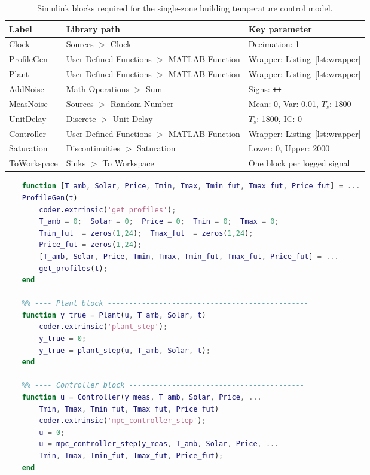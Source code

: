 \begin{table}[!htbp]
	\centering
	\caption{Simulink blocks required for the single-zone building
		temperature control model.}
	\label{tab:blocks}
	\begin{tabular}{>{\ttfamily\small}l >{\small}l >{\small}p{5.5cm}}
		\toprule
		\normalfont\textbf{Label} & \textbf{Library path} & \textbf{Key parameter} \\
		\midrule
		Clock       & Sources $>$ Clock                           & Decimation: 1 \\
		ProfileGen  & User-Defined Functions $>$ MATLAB Function  & Wrapper: Listing~\ref{lst:wrapper} \\
		Plant       & User-Defined Functions $>$ MATLAB Function  & Wrapper: Listing~\ref{lst:wrapper} \\
		AddNoise    & Math Operations $>$ Sum                     & Signs: \texttt{++} \\
		MeasNoise   & Sources $>$ Random Number                   & Mean: 0, Var: 0.01, $T_s$: 1800 \\
		UnitDelay   & Discrete $>$ Unit Delay                     & $T_s$: 1800, IC: 0 \\
		Controller  & User-Defined Functions $>$ MATLAB Function  & Wrapper: Listing~\ref{lst:wrapper} \\
		Saturation  & Discontinuities $>$ Saturation              & Lower: 0, Upper: 2000 \\
		ToWorkspace & Sinks $>$ To Workspace                      & One block per logged signal \\
		\bottomrule
	\end{tabular}
\end{table}

\begin{lstlisting}[language=Matlab,
	caption={Wrapper code for the three MATLAB Function blocks.  Each
		wrapper pre-allocates its outputs, declares the helper as
		extrinsic, and forwards its inputs --- following the pattern
		of Section~\ref{subsec:extrinsic}.},
	label={lst:wrapper}]
	%% ---- ProfileGen block ------------------------------------------
	function [T_amb, Solar, Price, Tmin, Tmax, Tmin_fut, Tmax_fut, Price_fut] = ...
	ProfileGen(t)
		coder.extrinsic('get_profiles');
		T_amb = 0;  Solar = 0;  Price = 0;  Tmin = 0;  Tmax = 0;
		Tmin_fut  = zeros(1,24);  Tmax_fut  = zeros(1,24);
		Price_fut = zeros(1,24);
		[T_amb, Solar, Price, Tmin, Tmax, Tmin_fut, Tmax_fut, Price_fut] = ...
		get_profiles(t);
	end
	
	%% ---- Plant block -----------------------------------------------
	function y_true = Plant(u, T_amb, Solar, t)
		coder.extrinsic('plant_step');
		y_true = 0;
		y_true = plant_step(u, T_amb, Solar, t);
	end
	
	%% ---- Controller block -----------------------------------------
	function u = Controller(y_meas, T_amb, Solar, Price, ...
		Tmin, Tmax, Tmin_fut, Tmax_fut, Price_fut)
		coder.extrinsic('mpc_controller_step');
		u = 0;
		u = mpc_controller_step(y_meas, T_amb, Solar, Price, ...
		Tmin, Tmax, Tmin_fut, Tmax_fut, Price_fut);
	end
\end{lstlisting}

